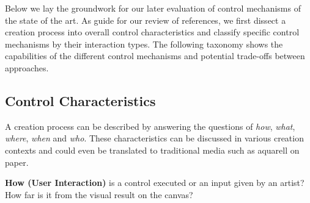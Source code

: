 Below we lay the groundwork for our later evaluation of control mechanisms of the state of the art. As guide for our review of references, we first dissect a creation process into overall control characteristics and classify specific control mechanisms by their interaction types. The following taxonomy shows the capabilities of the different control mechanisms and potential trade-offs between approaches.  

\newcommand{\controlParamsFigWidth}{0.9}

\subsection{Control Characteristics}\label{control_charateristics}
A creation process can be described by answering the questions of \textit{how}, \textit{what}, \textit{where}, \textit{when} and \textit{who}. These characteristics can be discussed in various creation contexts and could even be translated to traditional media such as aquarell on paper.

\noindent\textbf{How (User Interaction)} is a control executed or an input given by an artist? How far is it from the visual result on the canvas? 



